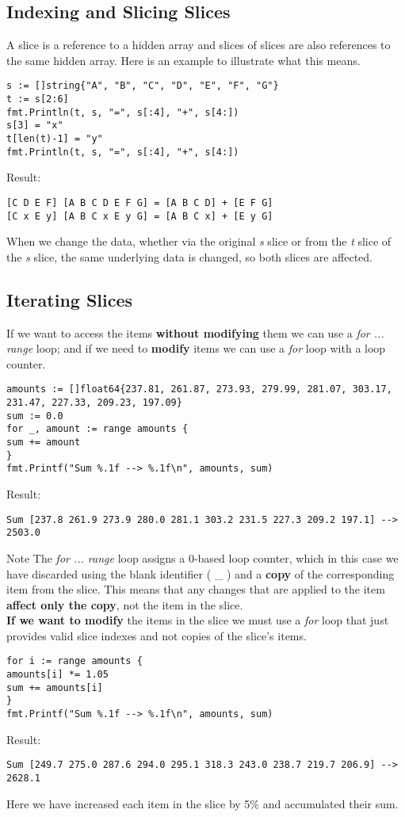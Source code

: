 \documentclass[10pt,letterpaper]{report}
\begin{document}
\subsection{Indexing and Slicing Slices}
A slice is a reference to a hidden array and slices of slices are also references to the same hidden array. Here is an example to illustrate what this means.
\begin{lstlisting}
s := []string{"A", "B", "C", "D", "E", "F", "G"}
t := s[2:6]
fmt.Println(t, s, "=", s[:4], "+", s[4:])
s[3] = "x"
t[len(t)-1] = "y"
fmt.Println(t, s, "=", s[:4], "+", s[4:])
\end{lstlisting}
Result:
\begin{lstlisting}
[C D E F] [A B C D E F G] = [A B C D] + [E F G]
[C x E y] [A B C x E y G] = [A B C x] + [E y G]
\end{lstlisting}
When we change the data, whether via the original \textit{s} slice or from the \textit{t} slice of the \textit{s} slice, the same underlying data is changed, so both slices are affected.
\subsection{Iterating Slices}
If we want to access the items \textbf{without modifying} them we can use a \textit{for ... range} loop; and if we need to \textbf{modify} items we can use a \textit{for} loop with a loop counter.
\begin{lstlisting}
amounts := []float64{237.81, 261.87, 273.93, 279.99, 281.07, 303.17,
231.47, 227.33, 209.23, 197.09}
sum := 0.0
for _, amount := range amounts {
sum += amount
}
fmt.Printf("Sum %.1f --> %.1f\n", amounts, sum)
\end{lstlisting}
Result:
\begin{lstlisting}
Sum [237.8 261.9 273.9 280.0 281.1 303.2 231.5 227.3 209.2 197.1] --> 2503.0
\end{lstlisting}
Note The \textit{for ...  range} loop assigns a 0-based loop counter, which in this case we have discarded using the blank identifier ( \_ ) and a \textbf{copy} of the corresponding item from the slice. This means that any changes that are applied to the item \textbf{affect only the copy}, not the item in the slice.\\
\textbf{If we want to modify} the items in the slice we must use a \textit{for} loop that just provides valid slice indexes and not copies of the slice's items.
\begin{lstlisting}
for i := range amounts {
amounts[i] *= 1.05
sum += amounts[i]
}
fmt.Printf("Sum %.1f --> %.1f\n", amounts, sum)
\end{lstlisting}
Result:
\begin{lstlisting}
Sum [249.7 275.0 287.6 294.0 295.1 318.3 243.0 238.7 219.7 206.9] --> 2628.1
\end{lstlisting}
Here we have increased each item in the slice by 5\% and accumulated their sum.
\end{document}

